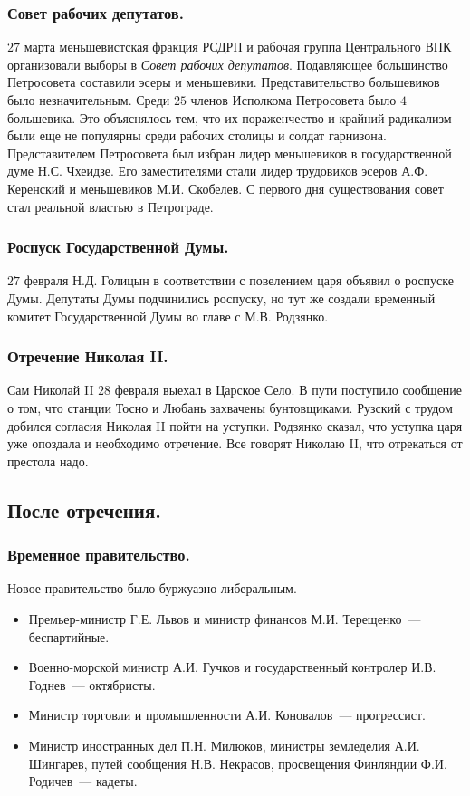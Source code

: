 \documentclass[12pt]{article}
\begin{document}
	\subsubsection{Совет рабочих депутатов.}
	$27$ марта меньшевистская фракция РСДРП и рабочая группа Центрального ВПК организовали выборы в \textit{Совет рабочих депутатов}. Подавляющее большинство Петросовета составили эсеры и меньшевики. Представительство большевиков было незначительным. Среди $25$ членов Исполкома Петросовета было $4$ большевика. Это объяснялось тем, что их пораженчество и крайний радикализм были еще не популярны среди рабочих столицы и солдат гарнизона. Представителем Петросовета был избран лидер меньшевиков в государственной думе Н.С. Чхеидзе. Его заместителями стали лидер трудовиков эсеров А.Ф. Керенский и меньшевиков М.И. Скобелев. С первого дня существования совет стал реальной властью в Петрограде.
	\subsubsection{Роспуск Государственной Думы.}
	$27$ февраля Н.Д. Голицын в соответствии с повелением царя объявил о роспуске Думы. Депутаты Думы подчинились роспуску, но тут же создали временный комитет Государственной Думы во главе с М.В. Родзянко.
	\subsubsection{Отречение Николая II.}
	Сам Николай II $28$ февраля выехал в Царское Село. В пути поступило сообщение о том, что станции Тосно и Любань захвачены бунтовщиками. Рузский с трудом добился согласия Николая II пойти на уступки. Родзянко сказал, что уступка царя уже опоздала и необходимо отречение. Все говорят Николаю II, что отрекаться от престола надо.
	\subsection{После отречения.}
	\subsubsection{Временное правительство.}
	Новое правительство было буржуазно-либеральным.
	\begin{itemize}
		\item Премьер-министр Г.Е. Львов и министр финансов М.И. Терещенко~--- беспартийные.
		\item Военно-морской министр А.И. Гучков и государственный контролер И.В. Годнев~--- октябристы.
		\item Министр торговли и промышленности А.И. Коновалов~--- прогрессист.
		\item Министр иностранных дел П.Н. Милюков, министры земледелия А.И. Шингарев, путей сообщения Н.В. Некрасов, просвещения Финляндии Ф.И. Родичев~--- кадеты.
	\end{itemize}
\end{document}
